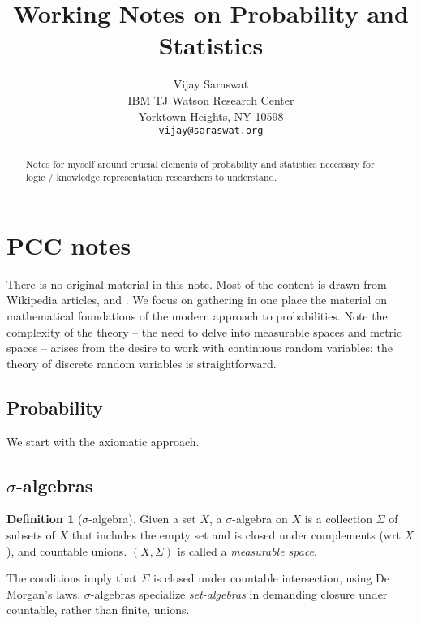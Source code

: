 \documentclass{article}
\title{Working Notes on Probability and Statistics}
\author{
  Vijay Saraswat \\
  IBM TJ Watson Research Center \\
  Yorktown Heights, NY 10598\\
  \texttt{vijay@saraswat.org} 
}
\theoremstyle{definition}
\newtheorem{definition}{Definition}[section]
\begin{document}

\maketitle
\begin{abstract}
  Notes for myself around crucial elements of probability and statistics necessary for logic / knowledge representation researchers to understand. 
\end{abstract}






\section{PCC notes}

There is no original material in this note. Most of the content is drawn from Wikipedia articles, \cite{lawler} and \cite{pgm-book}. We focus on gathering in one place the material on mathematical foundations of the modern approach to probabilities. Note the complexity of the theory -- the need to delve into measurable spaces and metric spaces --  arises from the desire to work with continuous random variables; the theory of discrete random variables is straightforward.

\subsection{Probability}

We start with the axiomatic approach.

\subsection{\(\sigma\)-algebras}
\begin{definition}[\(\sigma\)-algebra] Given a set \(X\), a \(\sigma\)-algebra on \(X\) is a collection \(\Sigma\) of subsets of \(X\) that includes the empty set and is closed under complements (wrt \(X\)), and countable unions. \((X,\Sigma)\) is called a {\em measurable space}.
\end{definition}
The conditions imply that \(\Sigma\) is closed under countable intersection, using De Morgan's laws. \(\sigma\)-algebras specialize {\em set-algebras} in demanding closure under countable, rather than finite, unions. 
\end{document}
